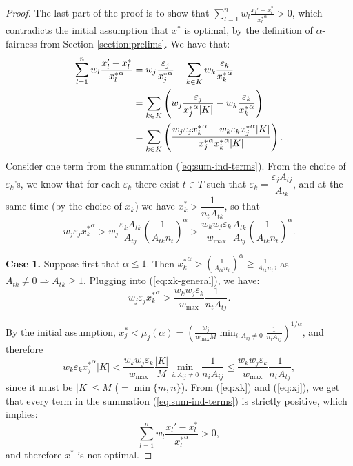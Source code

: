 \documentclass[11pt]{article}
\begin{document}
\begin{proof}
The last part of the proof is to show that $\sum_{l=1}^n w_l\frac{x_{l}'-x_l^*}{{x_l^*}^{\alpha}}>0$, which contradicts the initial assumption that $x^*$ is optimal, by the definition of $\alpha$-fairness from Section \ref{section:prelims}. We have that:
\begin{align}
\sum_{l=1}^n w_l\frac{x_{l}'-x_l^*}{{x_l^*}^{\alpha}} &= w_j\frac{\varepsilon_j}{{x_j^*}^{\alpha}} - \sum_{k\in K}w_k \frac{\varepsilon_k}{{x_k^*}^{\alpha}}\notag\\
&= \sum_{k\in K} \left(w_j\frac{\varepsilon_j}{{x_j^*}^{\alpha}|K|} - w_k \frac{\varepsilon_k}{{x_k^*}^{\alpha}}\right)\notag\\
&= \sum_{k\in K} \left(\frac{w_j\varepsilon_j{x_k^*}^{\alpha} - w_k\varepsilon_k{x_j^*}^{\alpha}|K|}{{x_j^*}^{\alpha}{x_k^*}^{\alpha}|K|}\right) . \label{eq:sum-ind-terms}
\end{align}
Consider one term from the summation (\ref{eq:sum-ind-terms}). From the choice of $\varepsilon_k$'s, we know that for each $\varepsilon_k$ there exist $t\in T$ such that $\varepsilon_k = \dfrac{\varepsilon_jA_{tj}}{A_{tk}}$, and at the same time (by the choice of $x_k$) we have $x_k^* > \dfrac{1}{n_t A_{tk}}$, so that
\begin{equation}
w_j\varepsilon_j{x_k^*}^{\alpha}> w_j\dfrac{\varepsilon_k A_{tk}}{A_{tj}}\left(\frac{1}{A_{tk}n_t}\right)^{\alpha}> \frac{w_kw_j\varepsilon_k }{w_{\max}}\dfrac{A_{tk}}{A_{tj}}\left(\frac{1}{A_{tk}n_t}\right)^{\alpha}.\label{eq:xk-general}
\end{equation}

\noindent\textbf{Case 1.} Suppose first that $\alpha\leq 1$. Then ${x_k^*}^{\alpha} > \left(\frac{1}{A_{tk}n_t}\right)^{\alpha}\geq \frac{1}{A_{tk}n_t}$, as $A_{tk}\neq 0\Rightarrow A_{tk}\geq 1$.  Plugging into (\ref{eq:xk-general}), we have:
\begin{equation}
w_j\varepsilon_j{x_k^*}^{\alpha}> \frac{w_kw_j\varepsilon_k}{w_{\max}}\dfrac{ 1}{n_tA_{tj}}\label{eq:xk}.
\end{equation}

By the initial assumption, $x_j^* < \mu_j(\alpha) = \left(\frac{w_j}{w_{\max}M}\min_{i: A_{ij}\neq 0}\frac{1}{n_i A_{ij}}\right)^{1/\alpha}$, and therefore 
\begin{equation}
w_k\varepsilon_k{x_j^*}^{\alpha}|K|< \frac{w_k w_j \varepsilon_k }{w_{\max}}\frac{|K|}{M}\min_{i: A_{ij}\neq 0}\frac{1}{n_i A_{ij}}\leq \frac{w_k w_j \varepsilon_k }{w_{\max}}\frac{1}{n_t A_{tj}}, \label{eq:xj}
\end{equation}
since it must be $|K|\leq M$ ($=\min\{m, n\}$). From (\ref{eq:xk}) and (\ref{eq:xj}), we get that every term in the summation (\ref{eq:sum-ind-terms}) is strictly positive, which implies:
\begin{equation*}
\sum_{l=1}^n w_l\frac{x_{l}'-x_l^*}{{x_l^*}^{\alpha}}>0,
\end{equation*}
and therefore $x^*$ is not optimal.


\end{proof}
\end{document}
